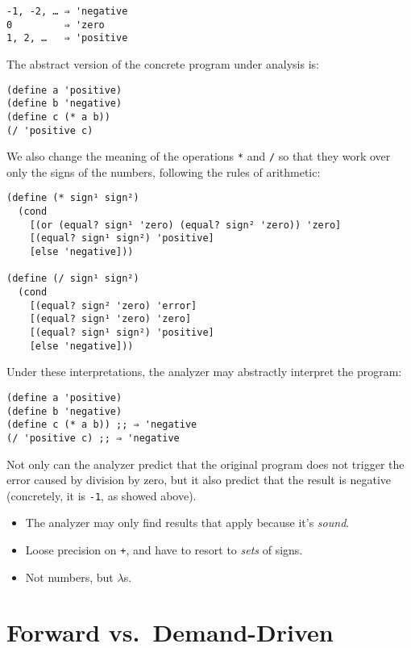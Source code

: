 \documentclass[12pt, oneside]{book}
\begin{document}
\begin{Verbatim}
-1, -2, … ⇒ 'negative
0         ⇒ 'zero
1, 2, …   ⇒ 'positive
\end{Verbatim}

The abstract version of the concrete program under analysis is:

\begin{Verbatim}
(define a 'positive)
(define b 'negative)
(define c (* a b))
(/ 'positive c)
\end{Verbatim}

We also change the meaning of the operations \texttt{*} and \texttt{/} so that they work over only the signs of the numbers, following the rules of arithmetic:

\begin{Verbatim}
(define (* sign¹ sign²)
  (cond
    [(or (equal? sign¹ 'zero) (equal? sign² 'zero)) 'zero]
    [(equal? sign¹ sign²) 'positive]
    [else 'negative]))

(define (/ sign¹ sign²)
  (cond
    [(equal? sign² 'zero) 'error]
    [(equal? sign¹ 'zero) 'zero]
    [(equal? sign¹ sign²) 'positive]
    [else 'negative]))
\end{Verbatim}

Under these interpretations, the analyzer may abstractly interpret the program:

\begin{Verbatim}
(define a 'positive)
(define b 'negative)
(define c (* a b)) ;; ⇒ 'negative
(/ 'positive c) ;; ⇒ 'negative
\end{Verbatim}

Not only can the analyzer predict that the original program does not trigger the error caused by division by zero, but it also predict that the result is negative (concretely, it is \texttt{-1}, as showed above).

\begin{itemize}
  \item The analyzer may only find results that apply because it’s \emph{sound}.
  \item Loose precision on \texttt{+}, and have to resort to \emph{sets} of signs.
  \item Not numbers, but \(λ\)s.
\end{itemize}

\section{Forward vs.\ Demand-Driven}
\label{section:forward-vs-demand-driven}
\end{document}
